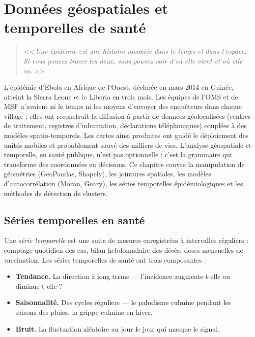 \chapter{Donn\'ees g\'eospatiales et temporelles de sant\'e}
\label{ch:geospatial-temporel}

\begin{quote}
\emph{<<\,Une \'epid\'emie est une histoire racont\'ee dans le temps et dans l'espace. Si vous pouvez tracer les deux, vous pouvez voir d'o\`u elle vient et o\`u elle va.\,>>}
\end{quote}

L'épidémie d'Ebola en Afrique de l'Ouest, déclarée en mars 2014 en Guinée, atteint la Sierra Leone et le Liberia en trois mois. Les équipes de l'OMS et de MSF n'avaient ni le temps ni les moyens d'envoyer des enquêteurs dans chaque village ; elles ont reconstruit la diffusion à partir de données géolocalisées (centres de traitement, registres d'inhumation, déclarations téléphoniques) couplées à des modèles spatio-temporels. Les cartes ainsi produites ont guidé le déploiement des unités mobiles et probablement sauvé des milliers de vies. L'analyse géospatiale et temporelle, en santé publique, n'est pas optionnelle : c'est la grammaire qui transforme des coordonnées en décisions. Ce chapitre couvre la manipulation de géométries (GeoPandas, Shapely), les jointures spatiales, les modèles d'autocorrélation (Moran, Geary), les séries temporelles épidémiologiques et les méthodes de détection de clusters.

\section{S\'eries temporelles en sant\'e}

Une \emph{s\'erie temporelle} est une suite de mesures enregistr\'ees \`a intervalles r\'eguliers : comptage quotidien des cas, bilan hebdomadaire des d\'ec\`es, doses mensuelles de vaccination. Les s\'eries temporelles de sant\'e ont trois composantes :

\begin{itemize}
  \item \textbf{Tendance.} La direction \`a long terme --- l'incidence augmente-t-elle ou diminue-t-elle ?
  \item \textbf{Saisonnalit\'e.} Des cycles r\'eguliers --- le paludisme culmine pendant les saisons des pluies, la grippe culmine en hiver.
  \item \textbf{Bruit.} La fluctuation al\'eatoire au jour le jour qui masque le signal.
\end{itemize}


